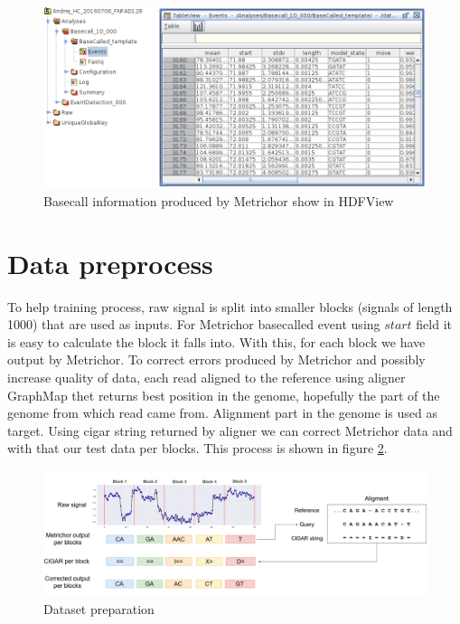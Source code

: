\documentclass[times, utf8, diplomski, numeric, english]{fer}
\begin{document}
\begin{figure}[!ht]
	\begin{center}
		\includegraphics[width=1\textwidth]{./imgs/basecall_events.png}
		\caption{Basecall information produced by Metrichor show in HDFView}
		\label{fg:events}
	\end{center}
\end{figure}



\section{Data preprocess}


To help training process, raw signal is split into smaller blocks (signals of length 1000) that are used as inputs. For Metrichor basecalled event using $start$ field it is easy to calculate the block it falls into. With this, for each block we have output by Metrichor. 
To correct errors produced by Metrichor and possibly increase quality of data, each read aligned to the reference using aligner GraphMap thet returns best position in the genome, hopefully the part of the genome from which read came from.
Alignment part in the genome is used as target. Using cigar string returned by aligner we can correct Metrichor data and with that our test data per blocks. This process is shown in figure \ref{fg:data_correction}.

\begin{figure}[!ht]
	\begin{center}
		\includegraphics[width=1\textwidth]{./imgs/train_data_correction.png}
		\caption{Dataset preparation}
		\label{fg:data_correction}
	\end{center}
\end{figure}
\end{document}

